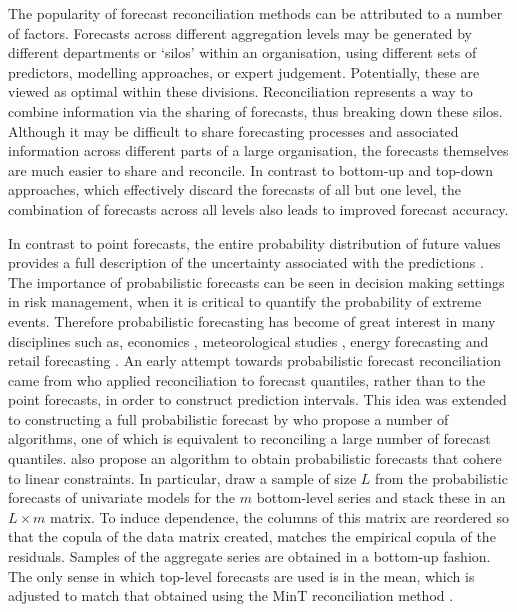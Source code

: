 \documentclass[a4paper,12pt]{article}
\theoremstyle{definition}
\begin{document}
{\color{red} The popularity of forecast reconciliation methods can be attributed to a number of factors. Forecasts across different aggregation levels may be generated by different departments or ‘silos’ within an organisation, using different sets of predictors, modelling approaches, or expert judgement. Potentially, these are viewed as optimal within these divisions. Reconciliation represents a way to combine information via the sharing of forecasts, thus breaking down these silos. Although it may be difficult to share forecasting processes and associated information across different parts of a large organisation, the forecasts themselves are much easier to share and reconcile. In contrast to bottom-up and top-down approaches, which effectively discard the forecasts of all but one level, the combination of forecasts across all levels also leads to improved forecast accuracy.}

In contrast to point forecasts, the entire probability distribution of future values provides a full description of the uncertainty associated with the predictions \citep{Gneiting2014}. The importance of probabilistic forecasts can be seen in decision making settings in risk management, when it is critical to quantify the probability of extreme events.  Therefore probabilistic forecasting has become of great interest in many disciplines such as, economics \citep{rossi2014}, meteorological studies \citep{mclean2013}, energy forecasting \citep{BenTaieb2017} and retail forecasting \citep{bose2017}.   An early attempt towards probabilistic forecast reconciliation came from \cite{ShaHyn2017} who applied reconciliation to forecast quantiles, rather than to the point forecasts, in order to construct prediction intervals. This idea was extended to constructing a full probabilistic forecast by \citet{JeoEtAl2019} who propose a number of algorithms, one of which is equivalent to reconciling a large number of forecast quantiles. \citet{Taieb2017} also propose an algorithm to obtain probabilistic forecasts that cohere to linear constraints. {\color{red} In particular, \citet{Taieb2017} draw a sample of size $L$ from the probabilistic forecasts of univariate models for the $m$ bottom-level series and stack these in an $L\times m$ matrix.  To induce dependence, the columns of this matrix are reordered so that the copula of the data matrix created, matches the empirical copula of the residuals. Samples of the aggregate series are obtained in a bottom-up fashion.} The only sense in which top-level forecasts are used is in the mean, which is adjusted to match that obtained using the MinT reconciliation method \citep{WicEtAl2019}.
\end{document}
